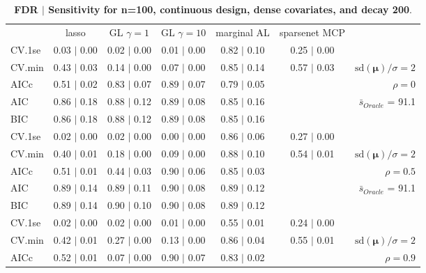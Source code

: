 \clearpage
\begin{table}\vspace{-.5cm}
\caption[l]{ {\it }
{ \bf FDR $\boldsymbol{\mid}$ Sensitivity for n=100, continuous design, dense covariates, and  decay  200}.}
\vspace{-.5cm}
\footnotesize{}
\begin{center}
\begin{tabular}{l*{5}{c}|r}
 & lasso & GL $\gamma=1$ & GL $\gamma=10$ & marginal AL & sparsenet MCP  & \\
 \cline{1-7}
CV.1se & 0.03 $\mid$ 0.00 & 0.02 $\mid$ 0.00 & 0.01 $\mid$ 0.00 & 0.82 $\mid$ 0.10 & 0.25 $\mid$ 0.00 & \\
CV.min & 0.43 $\mid$ 0.03 & 0.14 $\mid$ 0.00 & 0.07 $\mid$ 0.00 & 0.85 $\mid$ 0.14 & 0.57 $\mid$ 0.03 &  $\mathrm{sd}(\mathbf{\mu})/\sigma=2$ \\
AICc & 0.51 $\mid$ 0.02 & 0.83 $\mid$ 0.07 & 0.89 $\mid$ 0.07 & 0.79 $\mid$ 0.05 & & $\rho=0$ \\
AIC & 0.86 $\mid$ 0.18 & 0.88 $\mid$ 0.12 & 0.89 $\mid$ 0.08 & 0.85 $\mid$ 0.16 & &  \multirow{2}{*}{$\bar{s}_{Oracle}$ = 91.1} \\
BIC & 0.86 $\mid$ 0.18 & 0.88 $\mid$ 0.12 & 0.89 $\mid$ 0.08 & 0.85 $\mid$ 0.16 & &  \\
 \hline 
CV.1se & 0.02 $\mid$ 0.00 & 0.02 $\mid$ 0.00 & 0.00 $\mid$ 0.00 & 0.86 $\mid$ 0.06 & 0.27 $\mid$ 0.00 & \\
CV.min & 0.40 $\mid$ 0.01 & 0.18 $\mid$ 0.00 & 0.09 $\mid$ 0.00 & 0.88 $\mid$ 0.10 & 0.54 $\mid$ 0.01 &  $\mathrm{sd}(\mathbf{\mu})/\sigma=2$ \\
AICc & 0.51 $\mid$ 0.01 & 0.44 $\mid$ 0.03 & 0.90 $\mid$ 0.06 & 0.85 $\mid$ 0.03 & & $\rho=0.5$ \\
AIC & 0.89 $\mid$ 0.14 & 0.89 $\mid$ 0.11 & 0.90 $\mid$ 0.08 & 0.89 $\mid$ 0.12 & &  \multirow{2}{*}{$\bar{s}_{Oracle}$ = 91.1} \\
BIC & 0.89 $\mid$ 0.14 & 0.90 $\mid$ 0.10 & 0.90 $\mid$ 0.08 & 0.89 $\mid$ 0.12 & &  \\
 \hline 
CV.1se & 0.02 $\mid$ 0.00 & 0.02 $\mid$ 0.00 & 0.01 $\mid$ 0.00 & 0.55 $\mid$ 0.01 & 0.24 $\mid$ 0.00 & \\
CV.min & 0.42 $\mid$ 0.01 & 0.27 $\mid$ 0.00 & 0.13 $\mid$ 0.00 & 0.86 $\mid$ 0.04 & 0.55 $\mid$ 0.01 &  $\mathrm{sd}(\mathbf{\mu})/\sigma=2$ \\
AICc & 0.52 $\mid$ 0.01 & 0.07 $\mid$ 0.00 & 0.90 $\mid$ 0.07 & 0.83 $\mid$ 0.02 & & $\rho=0.9$ \\

\end{tabular}
\end{center}
\end{table}
